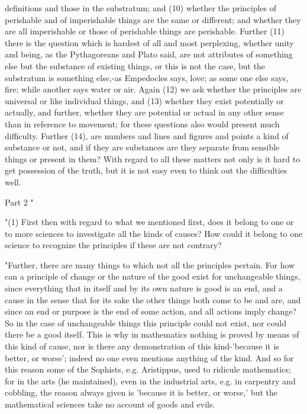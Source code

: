 definitions and those in the substratum; and (10) whether the principles
of perishable and of imperishable things are the same or different;
and whether they are all imperishable or those of perishable things
are perishable. Further (11) there is the question which is hardest
of all and most perplexing, whether unity and being, as the Pythagoreans
and Plato said, are not attributes of something else but the substance
of existing things, or this is not the case, but the substratum is
something else,-as Empedocles says, love; as some one else says, fire;
while another says water or air. Again (12) we ask whether the principles
are universal or like individual things, and (13) whether they exist
potentially or actually, and further, whether they are potential or
actual in any other sense than in reference to movement; for these
questions also would present much difficulty. Further (14), are numbers
and lines and figures and points a kind of substance or not, and if
they are substances are they separate from sensible things or present
in them? With regard to all these matters not only is it hard to get
possession of the truth, but it is not easy even to think out the
difficulties well. 

Part 2 "

"(1) First then with regard to what we mentioned first, does it belong
to one or to more sciences to investigate all the kinds of causes?
How could it belong to one science to recognize the principles if
these are not contrary? 

"Further, there are many things to which not all the principles pertain.
For how can a principle of change or the nature of the good exist
for unchangeable things, since everything that in itself and by its
own nature is good is an end, and a cause in the sense that for its
sake the other things both come to be and are, and since an end or
purpose is the end of some action, and all actions imply change? So
in the case of unchangeable things this principle could not exist,
nor could there be a good itself. This is why in mathematics nothing
is proved by means of this kind of cause, nor is there any demonstration
of this kind-'because it is better, or worse'; indeed no one even
mentions anything of the kind. And so for this reason some of the
Sophists, e.g. Aristippus, used to ridicule mathematics; for in the
arts (he maintained), even in the industrial arts, e.g. in carpentry
and cobbling, the reason always given is 'because it is better, or
worse,' but the mathematical sciences take no account of goods and
evils. 

